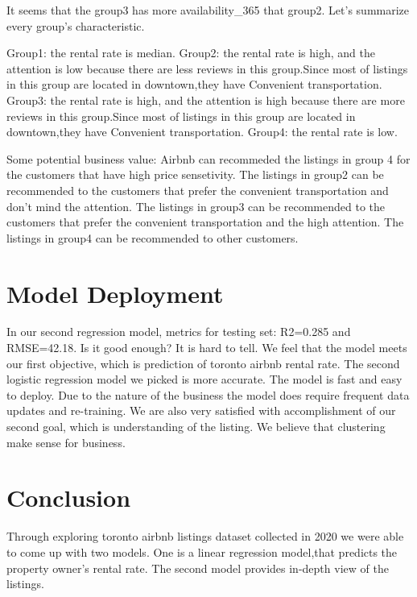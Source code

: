It seems that the group3 has more availability\_365 that group2. Let's
summarize every group's characteristic.

Group1: the rental rate is median. Group2: the rental rate is high, and
the attention is low because there are less reviews in this group.Since
most of listings in this group are located in downtown,they have
Convenient transportation. Group3: the rental rate is high, and the
attention is high because there are more reviews in this group.Since
most of listings in this group are located in downtown,they have
Convenient transportation. Group4: the rental rate is low.

Some potential business value: Airbnb can recommeded the listings in
group 4 for the customers that have high price sensetivity. The listings
in group2 can be recommended to the customers that prefer the convenient
transportation and don't mind the attention. The listings in group3 can
be recommended to the customers that prefer the convenient
transportation and the high attention. The listings in group4 can be
recommended to other customers.

\hypertarget{model-deployment}{%
\section{Model Deployment}\label{model-deployment}}

In our second regression model, metrics for testing set: R2=0.285 and
RMSE=42.18. Is it good enough? It is hard to tell. We feel that the
model meets our first objective, which is prediction of toronto airbnb
rental rate. The second logistic regression model we picked is more
accurate. The model is fast and easy to deploy. Due to the nature of the
business the model does require frequent data updates and re-training.
We are also very satisfied with accomplishment of our second goal, which
is understanding of the listing. We believe that clustering make sense
for business.

\hypertarget{conclusion}{%
\section{Conclusion}\label{conclusion}}

Through exploring toronto airbnb listings dataset collected in 2020 we
were able to come up with two models. One is a linear regression
model,that predicts the property owner's rental rate. The second model
provides in-depth view of the listings.

